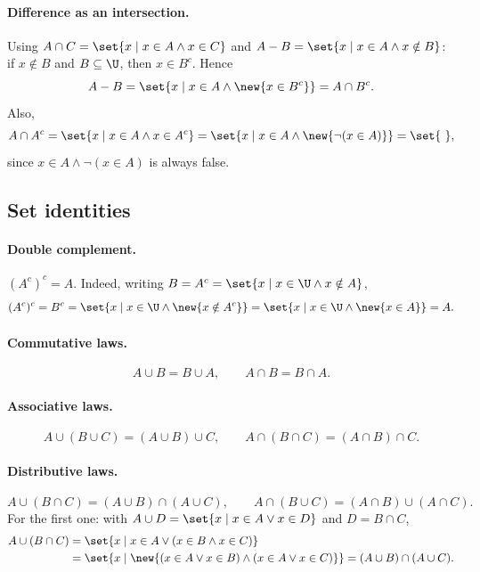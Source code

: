 \paragraph{Difference as an intersection.}
Using $A \cap C = \set{x \mid x \in A \wedge x \in C}$ and $A - B = \set{x \mid x \in A \wedge x \notin B}$: if $x \notin B$ and $B \subseteq \U$, then $x \in B^c$. Hence
\[
A - B = \set{x \mid x \in A \wedge \new{x \in B^c}} = A \cap B^c.
\]
Also,
\[
A \cap A^c = \set{x \mid x \in A \wedge x \in A^c} = \set{x \mid x \in A \wedge \new{\neg(x \in A)}} = \set{\ },
\]
since $x \in A \wedge \neg(x \in A)$ is always false.

\subsection{Set identities}

\paragraph{Double complement.} $(A^c)^c = A$. Indeed, writing $B = A^c = \set{x \mid x \in \U \wedge x \notin A}$,
\[
(A^c)^c = B^c = \set{x \mid x \in \U \wedge \new{x \notin A^c}} = \set{x \mid x \in \U \wedge \new{x \in A}} = A.
\]

\paragraph{Commutative laws.}
\[
A \cup B = B \cup A, \qquad A \cap B = B \cap A.
\]

\paragraph{Associative laws.}
\[
A \cup (B \cup C) = (A \cup B) \cup C, \qquad A \cap (B \cap C) = (A \cap B) \cap C.
\]

\paragraph{Distributive laws.}
\[
A \cup (B \cap C) = (A \cup B) \cap (A \cup C), \qquad A \cap (B \cup C) = (A \cap B) \cup (A \cap C).
\]
For the first one: with $A \cup D = \set{x \mid x \in A \vee x \in D}$ and $D = B \cap C$,
\begin{align*}
A \cup (B \cap C) &= \set{x \mid x \in A \vee (x \in B \wedge x \in C)}\\
&= \set{x \mid \new{(x \in A \vee x \in B) \wedge (x \in A \vee x \in C)}} = (A \cup B) \cap (A \cup C).
\end{align*}

